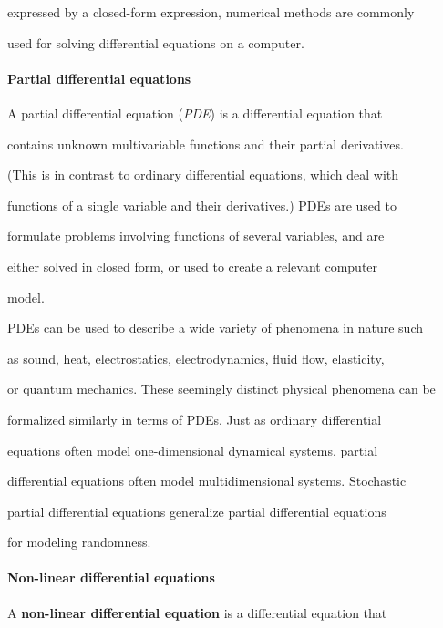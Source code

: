 expressed by a closed-form expression, numerical methods are commonly

used for solving differential equations on a computer.



\paragraph{Partial differential equations}



A partial differential equation (\textit{PDE}) is a differential equation that

contains unknown multivariable functions and their partial derivatives.

(This is in contrast to ordinary differential equations, which deal with

functions of a single variable and their derivatives.) PDEs are used to

formulate problems involving functions of several variables, and are

either solved in closed form, or used to create a relevant computer

model.



PDEs can be used to describe a wide variety of phenomena in nature such

as sound, heat, electrostatics, electrodynamics, fluid flow, elasticity,

or quantum mechanics. These seemingly distinct physical phenomena can be

formalized similarly in terms of PDEs. Just as ordinary differential

equations often model one-dimensional dynamical systems, partial

differential equations often model multidimensional systems. Stochastic

partial differential equations generalize partial differential equations

for modeling randomness.



\paragraph{Non-linear differential equations}



A \textbf{non-linear differential equation} is a differential equation that

